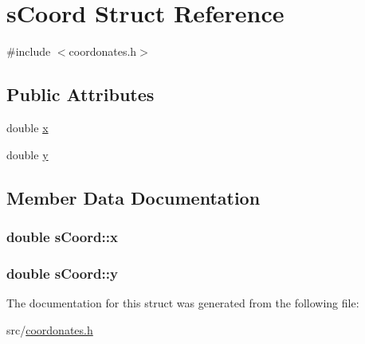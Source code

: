 \hypertarget{structs_coord}{\section{s\-Coord Struct Reference}
\label{structs_coord}
}


{\ttfamily \#include $<$coordonates.\-h$>$}

\subsection*{Public Attributes}
\begin{DoxyCompactItemize}
\item 
double \hyperlink{structs_coord_aebc2748908bfc0b9b780a5ced9859cd0}{x}
\item 
double \hyperlink{structs_coord_ad7507a4bcfb7453f637721d3d265103e}{y}
\end{DoxyCompactItemize}


\subsection{Member Data Documentation}
\hypertarget{structs_coord_aebc2748908bfc0b9b780a5ced9859cd0}{
\subsubsection[{x}]{\setlength{\rightskip}{0pt plus 5cm}double s\-Coord\-::x}}\label{structs_coord_aebc2748908bfc0b9b780a5ced9859cd0}
\hypertarget{structs_coord_ad7507a4bcfb7453f637721d3d265103e}{
\subsubsection[{y}]{\setlength{\rightskip}{0pt plus 5cm}double s\-Coord\-::y}}\label{structs_coord_ad7507a4bcfb7453f637721d3d265103e}


The documentation for this struct was generated from the following file\-:\begin{DoxyCompactItemize}
\item 
src/\hyperlink{coordonates_8h}{coordonates.\-h}\end{DoxyCompactItemize}

